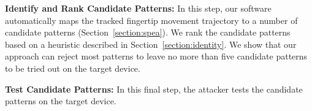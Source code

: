      \vspace{2mm}
    \noindent {} \textbf{Identify and Rank Candidate Patterns:} In this step, our software automatically maps the tracked fingertip movement trajectory to a number of candidate patterns (Section~\ref{section:spea}).
    We rank the candidate patterns based on a heuristic described in Section~\ref{section:identity}.
    We show that our approach can reject most patterns to leave no more than five candidate patterns to be tried out on the target device.

     \vspace{2mm}
    \noindent {} \textbf{Test Candidate Patterns:} In this final step, the attacker tests the candidate patterns on the target device.


